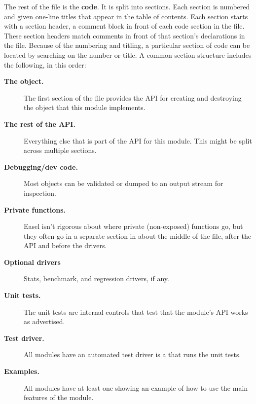 

The rest of the file is the {\bfseries code}. It is split into
sections. Each section is numbered and given one-line titles that
appear in the table of contents.  Each section starts with a section
header, a comment block in front of each code section in the
 file.  These section headers match comments in front of
that section's declarations in the  file. Because of the
numbering and titling, a particular section of code can be located by
searching on the number or title.  A common section structure includes
the following, in this order:


\begin{description}
\item[\textbf{The  object.}]
  The first section of the file provides the API for creating and
  destroying the object that this module implements.

\item[\textbf{The rest of the API.}]
  Everything else that is part of the API for this module.
  This might be split across multiple sections.

\item[\textbf{Debugging/dev code.}]
  Most objects can be validated or dumped to an output stream
  for inspection.

\item[\textbf{Private functions.}]
  Easel isn't rigorous about where private (non-exposed) functions go,
  but they often go in a separate section in about the middle of the
   file, after the API and before the drivers.

\item[\textbf{Optional drivers}] Stats, benchmark, and regression
  drivers, if any. 

\item [\textbf{Unit tests.}]
  The unit tests are internal controls that test that the module's API
  works as advertised.

\item [\textbf{Test driver.}]
  All modules have an automated test driver is a  that
  runs the unit tests.
 
\item [\textbf{Examples.}]
  All modules have at least one  showing an example of
  how to use the main features of the module.

\end{description}

